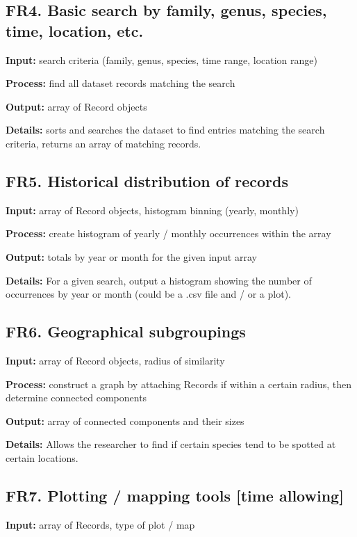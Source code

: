 \documentclass{article}
\begin{document}
\subsection{FR4. Basic search by family, genus, species, time, location, etc.}
\noindent \textbf{Input:} search criteria (family, genus, species, time range, location range)

\noindent \textbf{Process:} find all dataset records matching the search

\noindent \textbf{Output:} array of Record objects

\noindent \textbf{Details:} sorts and searches the dataset to find entries matching the search criteria, returns an array of matching records.

\subsection{FR5. Historical distribution of records}
\noindent \textbf{Input:} array of Record objects, histogram binning (yearly, monthly)

\noindent \textbf{Process:} create histogram of yearly / monthly occurrences within the array

\noindent \textbf{Output:} totals by year or month for the given input array

\noindent \textbf{Details:} For a given search, output a histogram showing the number of occurrences by year or month (could be a .csv file and / or a plot).

\subsection{FR6. Geographical subgroupings}
\noindent \textbf{Input:} array of Record objects, radius of similarity

\noindent \textbf{Process:} construct a graph by attaching Records if within a certain radius, then determine connected components

\noindent \textbf{Output:} array of connected components and their sizes

\noindent \textbf{Details:} Allows the researcher to find if certain species tend to be spotted at certain locations.

\subsection{FR7. Plotting / mapping tools [time allowing]}
\noindent \textbf{Input:} array of Records, type of plot / map
\end{document}

